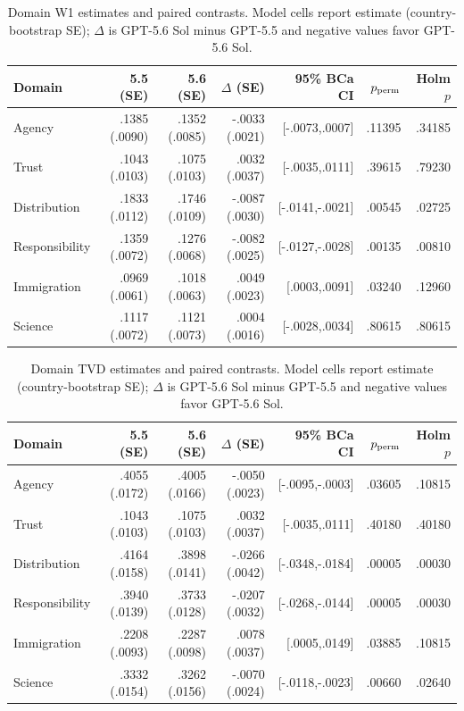 \begin{table}[!htbp]
\centering
\small
\setlength{\tabcolsep}{1.8pt}
\caption{Domain W1 estimates and paired contrasts. Model cells report estimate (country-bootstrap SE); $\Delta$ is GPT-5.6 Sol minus GPT-5.5 and negative values favor GPT-5.6 Sol.}\label{tab:domain-w1}
\begin{tabular}{@{}lrrrrrr@{}}
\toprule
\rowcolor{tablehead} Domain & 5.5 (SE) & 5.6 (SE) & $\Delta$ (SE) & 95\% BCa CI & $p_{\rm perm}$ & Holm $p$ \\
\midrule
Agency & .1385 (.0090) & .1352 (.0085) & -.0033 (.0021) & [-.0073,.0007] & .11395 & .34185 \\
Trust & .1043 (.0103) & .1075 (.0103) & .0032 (.0037) & [-.0035,.0111] & .39615 & .79230 \\
\rowcolor{improvebg}
Distribution & .1833 (.0112) & .1746 (.0109) & -.0087 (.0030) & [-.0141,-.0021] & .00545 & .02725 \\
\rowcolor{improvebg}
Responsibility & .1359 (.0072) & .1276 (.0068) & -.0082 (.0025) & [-.0127,-.0028] & .00135 & .00810 \\
Immigration & .0969 (.0061) & .1018 (.0063) & .0049 (.0023) & [.0003,.0091] & .03240 & .12960 \\
Science & .1117 (.0072) & .1121 (.0073) & .0004 (.0016) & [-.0028,.0034] & .80615 & .80615 \\
\bottomrule
\end{tabular}
\end{table}
\begin{table}[!htbp]
\centering
\small
\setlength{\tabcolsep}{1.8pt}
\caption{Domain TVD estimates and paired contrasts. Model cells report estimate (country-bootstrap SE); $\Delta$ is GPT-5.6 Sol minus GPT-5.5 and negative values favor GPT-5.6 Sol.}\label{tab:domain-tvd}
\begin{tabular}{@{}lrrrrrr@{}}
\toprule
\rowcolor{tablehead} Domain & 5.5 (SE) & 5.6 (SE) & $\Delta$ (SE) & 95\% BCa CI & $p_{\rm perm}$ & Holm $p$ \\
\midrule
Agency & .4055 (.0172) & .4005 (.0166) & -.0050 (.0023) & [-.0095,-.0003] & .03605 & .10815 \\
Trust & .1043 (.0103) & .1075 (.0103) & .0032 (.0037) & [-.0035,.0111] & .40180 & .40180 \\
\rowcolor{improvebg}
Distribution & .4164 (.0158) & .3898 (.0141) & -.0266 (.0042) & [-.0348,-.0184] & .00005 & .00030 \\
\rowcolor{improvebg}
Responsibility & .3940 (.0139) & .3733 (.0128) & -.0207 (.0032) & [-.0268,-.0144] & .00005 & .00030 \\
Immigration & .2208 (.0093) & .2287 (.0098) & .0078 (.0037) & [.0005,.0149] & .03885 & .10815 \\
\rowcolor{improvebg}
Science & .3332 (.0154) & .3262 (.0156) & -.0070 (.0024) & [-.0118,-.0023] & .00660 & .02640 \\
\bottomrule
\end{tabular}
\end{table}
